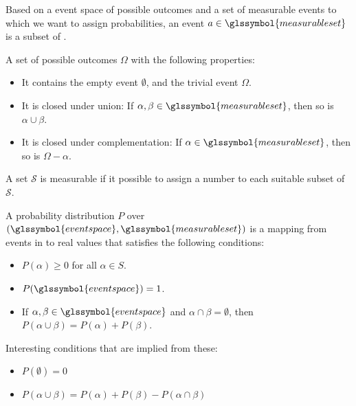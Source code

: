 
{%
  Based on a \gls{event space} of possible outcomes  and a set of measurable events  to which we want to assign probabilities, an event $a \in \glssymbol{measurable set}$ is a subset of .\\
}

{%
  A set of possible outcomes $\Omega$ with the following properties:
  \begin{itemize}
    \item It contains the empty event $\emptyset$, and the trivial event $\Omega$.
    \item It is closed under union: If $\alpha, \beta \in \glssymbol{measurable set}$, then so is $\alpha \cup \beta$.
    \item It is closed under complementation: If $\alpha \in \glssymbol{measurable set}$, then so is $\Omega - \alpha$.
  \end{itemize}
}

{%
  A set $\mathcal{S}$ is measurable if it possible to assign a number to each suitable subset of $\mathcal{S}$.
}

{%
  A probability distribution $P$ over $(\glssymbol{event space},\glssymbol{measurable set})$ is a mapping from events in  to real values that satisfies the following conditions:
  \begin{itemize}
    \item $P(\alpha)\geq 0 $ for all $ \alpha \in S$.
    \item $P(\glssymbol{event space})=1$.
    \item If $\alpha,\beta\in \glssymbol{event space}$ and $\alpha\cap\beta = \emptyset$, then $P(\alpha\cup\beta)=P(\alpha)+P(\beta)$.
  \end{itemize}
  Interesting conditions that are implied from these:
  \begin{itemize}
    \item $P(\emptyset)=0$
    \item $P(\alpha\cup\beta)=P(\alpha)+P(\beta)-P(\alpha\cap\beta)$
  \end{itemize}
}

